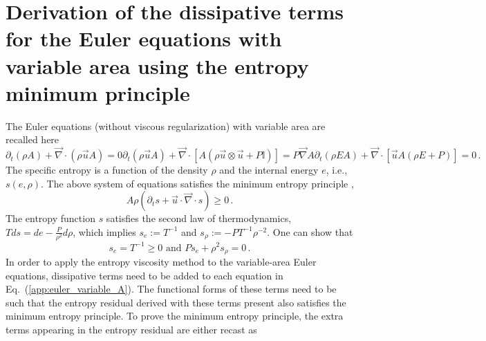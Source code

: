 \documentclass[review,10pt]{elsarticle}
\renewcommand{\div}{\vec{\nabla}\! \cdot \!}
\newcommand{\grad}{\vec{\nabla}}
\newcommand{\eqt}[1]{Eq.~(\ref{#1})}                     %
\begin{document}
\section{Derivation of the dissipative terms for the Euler equations with variable area using the entropy minimum principle} \label{app:diss_terms}
%
The Euler equations (without viscous regularization) with variable area are recalled here
%
\begin{subequations}
\label{app:euler_variable_A}
%
\begin{equation}
\partial_t \left( \rho A \right) + \div \left( \rho \vec{u} A \right) = 0 
\end{equation}
%
\begin{equation}
\partial_t \left( \rho \vec{u} A \right) + \div \left[A\left( \rho \vec{u} \otimes \vec{u} + P \mathbb{I} \right) \right] = P \grad A 
\end{equation}
% 
\begin{equation}
\partial_t \left( \rho E A \right) + \div \left[ \vec{u} A \left( \rho E + P \right) \right] = 0 \,.
\end{equation}
\end{subequations}
%
The specific entropy is a function of the density $\rho$ and the internal energy $e$, i.e., $s(e,\rho)$. The 
above system of equations satisfies the minimum entropy principle \cite{Leveque},
%
\begin{equation}
A \rho \left( \partial_t s + \vec{u} \cdot \div s \right) \geq 0 \, .
\end{equation}
%
The entropy function $s$ satisfies the second law of thermodynamics, $T ds = de - \frac{P}{\rho^2} d \rho$, 
which implies $s_e := T^{-1}$ and $s_\rho := -P T^{-1} \rho^{-2}$. One can show that \cite{jlg}
%
\begin{equation}
s_e = T^{-1} \geq 0 \text{ and }
Ps_e + \rho^2 s_{\rho} = 0 \,.
\end{equation}
%
In order to apply the entropy viscosity method to the variable-area Euler equations, dissipative terms need to 
be added to each equation in \eqt{app:euler_variable_A}. The functional forms of these terms need to be such 
that the entropy residual derived with these terms present also satisfies the minimum entropy principle. 
To prove the minimum entropy principle, the extra terms appearing in the entropy residual are either recast as 
\end{document}
